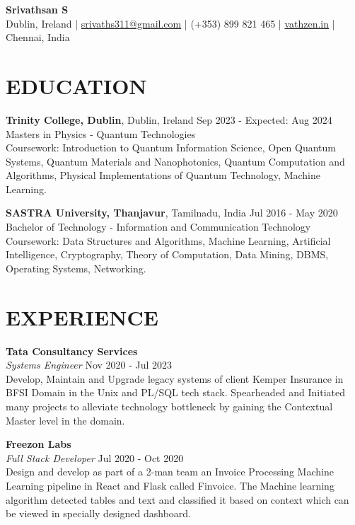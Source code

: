 \documentclass[a4paper,9pt]{extarticle}
\begin{document}
\pagestyle{empty}

\begin{center}
    \textbf{\Large Srivathsan S}\\[2pt]
    Dublin, Ireland | \href{mailto:srivaths311@gmail.com}{srivaths311@gmail.com} | (+353) 899 821 465 | \href{https://www.vathzen.in}{vathzen.in} | Chennai, India 
\end{center}

\section*{EDUCATION}
\noindent
\textbf{Trinity College, Dublin}, Dublin, Ireland \hfill Sep 2023 - Expected: Aug 2024\\[1pt] 
Masters in Physics - Quantum Technologies\\[1pt]
Coursework: Introduction to Quantum Information Science, Open Quantum Systems, Quantum Materials and Nanophotonics, Quantum Computation and
Algorithms, Physical Implementations of Quantum Technology, Machine Learning.

\noindent
\textbf{SASTRA University, Thanjavur}, Tamilnadu, India \hfill Jul 2016 - May 2020\\[1pt] 
Bachelor of Technology - Information and Communication Technology\\[1pt]
Coursework: Data Structures and Algorithms, Machine Learning, Artificial Intelligence, Cryptography, Theory of Computation, Data Mining,
DBMS, Operating Systems, Networking.

\section*{EXPERIENCE}
\noindent
\textbf{Tata Consultancy Services}\\[1pt]
\textit{Systems Engineer} \hfill Nov 2020 - Jul 2023\\[1pt]
Develop, Maintain and Upgrade legacy systems of client Kemper Insurance in BFSI Domain in the Unix and PL/SQL tech stack.
Spearheaded and Initiated many projects to alleviate technology bottleneck by gaining the Contextual Master level in the
domain.

\noindent
\textbf{Freezon Labs}\\[1pt]
\textit{Full Stack Developer} \hfill Jul 2020 - Oct 2020\\[1pt]
Design and develop as part of a 2-man team an Invoice Processing Machine Learning pipeline in React and Flask called Finvoice.
The Machine learning algorithm detected tables and text and classified it based on context which can be viewed in specially designed dashboard.
\end{document}
